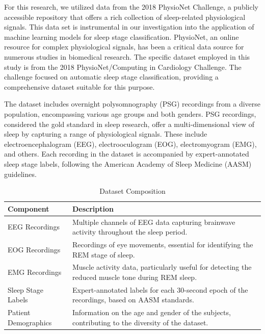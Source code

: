 \documentclass[12pt, a4paper,oneside]{book}
\numberwithin{equation}{section}
\begin{document}
For this research, we utilized data from the 2018 PhysioNet Challenge, a publicly accessible repository that offers a rich collection of sleep-related physiological signals. This data set is instrumental in our investigation into the application of machine learning models for sleep stage classification.
PhysioNet, an online resource for complex physiological signals, has been a critical data source for numerous studies in biomedical research. The specific dataset employed in this study is from the 2018 PhysioNet/Computing in Cardiology Challenge. The challenge focused on automatic sleep stage classification, providing a comprehensive dataset suitable for this purpose.\cite{PhysioNet2018}

The dataset includes overnight polysomnography (PSG) recordings from a diverse population, encompassing various age groups and both genders. PSG recordings, considered the gold standard in sleep research, offer a multi-dimensional view of sleep by capturing a range of physiological signals. These include electroencephalogram (EEG), electrooculogram (EOG), electromyogram (EMG), and others. Each recording in the dataset is accompanied by expert-annotated sleep stage labels, following the American Academy of Sleep Medicine (AASM) guidelines.\cite{PhysioNet2018}

\begin{table}[ht]
\centering
\caption{Dataset Composition}
\label{tab:dataset-composition}
\begin{tabular}{|l|p{10cm}|}
\hline
\textbf{Component} & \textbf{Description} \\ \hline
EEG Recordings & Multiple channels of EEG data capturing brainwave activity throughout the sleep period. \\ \hline
EOG Recordings & Recordings of eye movements, essential for identifying the REM stage of sleep. \\ \hline
EMG Recordings & Muscle activity data, particularly useful for detecting the reduced muscle tone during REM sleep. \\ \hline
Sleep Stage Labels & Expert-annotated labels for each 30-second epoch of the recordings, based on AASM standards. \\ \hline
Patient Demographics & Information on the age and gender of the subjects, contributing to the diversity of the dataset. \\ \hline
\end{tabular}
\end{table}
\end{document}
